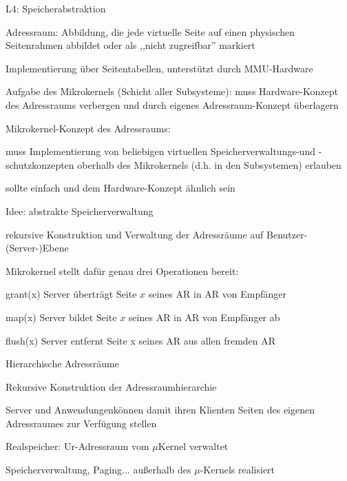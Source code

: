 \documentclass[a4paper]{article}
\begin{document}
\begin{multicols}{3}
    L4: Speicherabstraktion
    \begin{itemize*}
        \item Adressraum: Abbildung, die jede virtuelle Seite auf einen physischen Seitenrahmen abbildet oder als ,,nicht zugreifbar'' markiert
        \item Implementierung über Seitentabellen, unterstützt durch MMU-Hardware
        \item Aufgabe des Mikrokernels (Schicht aller Subsysteme): muss Hardware-Konzept des Adressraums verbergen und durch eigenes Adressraum-Konzept überlagern
        \item Mikrokernel-Konzept des Adressraums:
        \begin{itemize*}
            \item muss Implementierung von beliebigen virtuellen Speicherverwaltungs-und -schutzkonzepten oberhalb des Mikrokernels (d.h. in den Subsystemen) erlauben
            \item sollte einfach und dem Hardware-Konzept ähnlich sein
        \end{itemize*}
        \item Idee: abstrakte Speicherverwaltung
        \begin{itemize*}
            \item rekursive Konstruktion und Verwaltung der Adressräume auf Benutzer-(Server-)Ebene
            \item Mikrokernel stellt dafür genau drei Operationen bereit:
        \end{itemize*}
    \end{itemize*}
    \begin{description*}
        \item[grant(x)] Server überträgt Seite $x$ seines AR in AR von Empfänger
        \item[map(x)] Server bildet Seite $x$ seines AR in AR von Empfänger ab
        \item[flush(x)] Server entfernt Seite x seines AR aus allen fremden AR
    \end{description*}

    Hierarchische Adressräume
    \begin{itemize*}
        \item Rekursive Konstruktion der Adressraumhierarchie
        \item Server und Anwendungenkönnen damit ihren Klienten Seiten des eigenen Adressraumes zur Verfügung stellen
        \item Realspeicher: Ur-Adressraum vom $\mu$Kernel verwaltet
        \item Speicherverwaltung, Paging... außerhalb des $\mu$-Kernels realisiert
    \end{itemize*}


\end{multicols}
\end{document}
